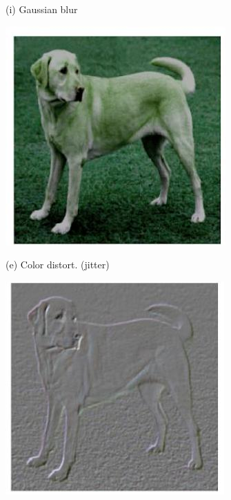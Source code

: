 \documentclass[10pt]{article}
\begin{document}
(i) Gaussian blur

\begin{center}
\includegraphics[max width=\textwidth]{2024_01_08_7c14f4867d7823fc5a52g-14}
\end{center}

(e) Color distort. (jitter)

\begin{center}
\includegraphics[max width=\textwidth]{2024_01_08_7c14f4867d7823fc5a52g-14(8)}
\end{center}
\end{document}
